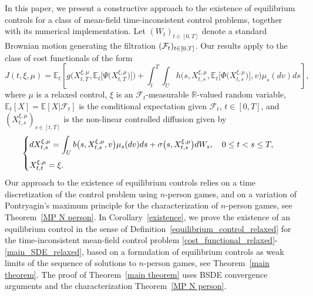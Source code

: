 \documentclass[12pt]{article}
\theoremstyle{named}
\numberwithin{equation}{section}
\newcommand{\E}{\mathbb{E}}
\newcommand{\real}{\mathbb{R}}
\begin{document}
 In this paper, we present a constructive approach to the existence of
 equilibrium controls for
a class of
mean-field time-inconsistent control problems,
together with its numerical implementation.
Let $(W_t)_{t\in [0,T]}$ denote a standard Brownian motion
generating the filtration $({\cal F}_t)_{t\in [0,T]}$.
Our results apply to the class of cost functionals of the form
\begin{equation}
\label{cost_functional_relaxed}
 J(t,\xi,\mu) = \mathbb{E}_t\left[
   g\big(X^{\xi,\mu}_{t,T}, \mathbb{E}_t \big[\Psi\big( X^{\xi,\mu}_{t,T}\big)\big]
   \big)
   +
   \int_t^T \int_U h\big(s, X^{\xi,\mu}_{t,s}, \mathbb{E}_t\big[\Phi\big( X^{\xi,\mu}_{t,s}\big) \big], v\big) \mu_s(dv) ds
   \right],
\end{equation}
 where $\mu$ is a relaxed control,
 $\xi$ is an $\mathcal{F}_t$-measurable $\real$-valued random variable,
 $\E_t [X] = \E[X | \mathcal{F}_t]$ is the conditional expectation given
 $\mathcal{F}_t$, $t \in [0,T]$,
 and $(X^{\xi,\mu}_{t,s})_{s\in [t,T]}$ is the
non-linear controlled diffusion given by
\begin{equation}
  \label{main_SDE_relaxed}
\begin{cases}
  \displaystyle
  dX^{\xi,\mu}_{t,s} = \int_U b\big(s,X^{\xi,\mu}_{t,s},v\big) \mu_s(dv) ds + \sigma\big(s,X^{\xi,\mu}_{t,s}\big) dW_s, \quad 0 \leq t<s \leq T,
  \medskip
  \\
X^{\xi,\mu}_{t,t} = \xi.
\end{cases}
\end{equation}
\noindent
 Our approach to the existence of equilibrium controls
 relies on a time discretization of the control problem
using ${n}$-person games, and on
a variation of Pontryagin's maximum principle for
the characterization of
 ${n}$-person games, see Theorem~\ref{MP N person}.
In Corollary~\ref{existence}, we prove the existence of an equilibrium control
in the sense of Definition~\ref{equilibrium_control_relaxed}
for the time-inconsistent mean-field control problem
\eqref{cost_functional_relaxed}-\eqref{main_SDE_relaxed},
 based on
 a formulation of equilibrium controls
as weak limits of the sequence of solutions to
${n}$-person games, see Theorem~\ref{main theorem}.
The proof of Theorem~\ref{main theorem}
uses BSDE convergence arguments and the characterization
Theorem~\ref{MP N person}.

\medskip
\end{document}
